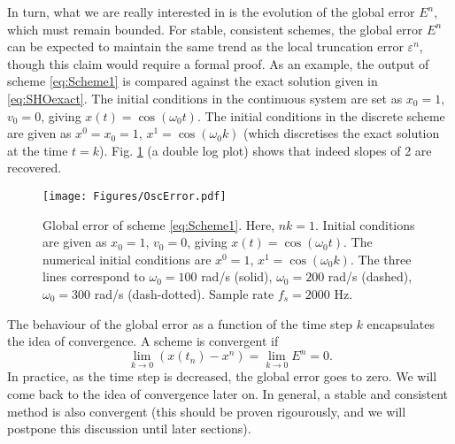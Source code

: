 In turn, what we are really interested in is the evolution of the global error $E^n$, which must remain bounded. For stable, consistent schemes, the global error $E^n$ can be expected to maintain the same trend as the local truncation error $\varepsilon^n$, though this claim would require a formal proof. As an example, the output of scheme \eqref{eq:Scheme1} is compared against the exact solution given in \eqref{eq:SHOexact}. The initial conditions in the continuous system are set as $x_0 =1$, $v_0 = 0$, giving $x(t) = \cos(\omega_0 t)$. The initial conditions in the discrete scheme are given as $x^0 = x_0 = 1$, $x^1 = \cos(\omega_0 k)$ (which discretises the exact solution at the time $t=k$). Fig. \ref{fig:SHOerrs} (a double log plot) shows that indeed slopes of 2 are recovered.


\begin{figure}
    \texttt{[image: Figures/OscError.pdf]}
    \caption{Global error of scheme \eqref{eq:Scheme1}. Here, $nk = 1$. Initial conditions are given as $x_0 = 1$, $v_0 = 0$, giving $x(t) = \cos(\omega_0 t)$. The numerical initial conditions are $x^0 = 1$, $x^1 = \cos(\omega_0 k)$. The three lines correspond to $\omega_0 = 100$ rad/s (solid), $\omega_0 = 200$ rad/s (dashed), $\omega_0 = 300$ rad/s (dash-dotted). Sample rate $f_s = 2000$ Hz.}\label{fig:SHOerrs}
\end{figure}



The behaviour of the global error as a function of the time step $k$ encapsulates the idea of convergence. A scheme is convergent if 
\begin{equation}\label{eq:convDef}
    \lim_{k\rightarrow 0} (x(t_n)-x^n) = \lim_{k\rightarrow 0} E^n = 0.
\end{equation}
In practice, as the time step is decreased, the global error goes to zero. We will come back to the idea of convergence later on. In general, a stable and consistent method is also convergent (this should be proven rigourously, and we will postpone this discussion until later sections).  


